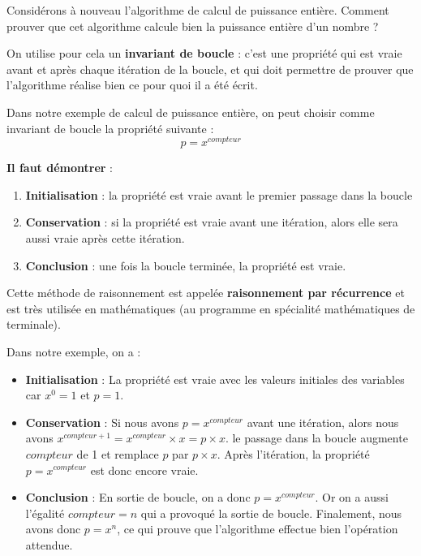 \documentclass[
  a4paper,
  DIV=11,
  numbers=noendperiod]{scrartcl}
\providecommand{\tightlist}{%
  \setlength{\itemsep}{0pt}\setlength{\parskip}{0pt}}\usepackage{longtable,booktabs,array}
\begin{document}
Considérons à nouveau l'algorithme de calcul de puissance entière.
Comment prouver que cet algorithme calcule bien la puissance entière
d'un nombre ?

On utilise pour cela un \textbf{invariant de boucle} : c'est une
propriété qui est vraie avant et après chaque itération de la boucle, et
qui doit permettre de prouver que l'algorithme réalise bien ce pour quoi
il a été écrit.

Dans notre exemple de calcul de puissance entière, on peut choisir comme
invariant de boucle la propriété suivante : \[p=x^{compteur}\]

\begin{tcolorbox}[enhanced jigsaw, rightrule=.15mm, opacitybacktitle=0.6, bottomrule=.15mm, toprule=.15mm, breakable, colback=white, colframe=quarto-callout-important-color-frame, left=2mm, leftrule=.75mm, bottomtitle=1mm, titlerule=0mm, coltitle=black, toptitle=1mm, title=\textcolor{quarto-callout-important-color}{\faExclamation}\hspace{0.5em}{Pour prouver q'une propriété est un invariant de boucle\ldots{}}, arc=.35mm, opacityback=0, colbacktitle=quarto-callout-important-color!10!white]

\textbf{Il faut démontrer} :

\begin{enumerate}
\def\labelenumi{\arabic{enumi}.}
\tightlist
\item
  \textbf{Initialisation} : la propriété est vraie avant le premier
  passage dans la boucle
\item
  \textbf{Conservation} : si la propriété est vraie avant une itération,
  alors elle sera aussi vraie après cette itération.
\item
  \textbf{Conclusion} : une fois la boucle terminée, la propriété est
  vraie.
\end{enumerate}

\end{tcolorbox}

Cette méthode de raisonnement est appelée \textbf{raisonnement par
récurrence} et est très utilisée en mathématiques (au programme en
spécialité mathématiques de terminale).

Dans notre exemple, on a :

\begin{itemize}
\tightlist
\item
  \textbf{Initialisation} : La propriété est vraie avec les valeurs
  initiales des variables car \(x^0=1\) et \(p=1\).
\item
  \textbf{Conservation} : Si nous avons \(p=x^{compteur}\) avant une
  itération, alors nous avons
  \(x^{compteur+1}=x^{compteur}\times x = p\times x\). le passage dans
  la boucle augmente \(compteur\) de 1 et remplace \(p\) par
  \(p\times x\). Après l'itération, la propriété \(p=x^{compteur}\) est
  donc encore vraie.
\item
  \textbf{Conclusion} : En sortie de boucle, on a donc
  \(p=x^{compteur}\). Or on a aussi l'égalité \(compteur = n\) qui a
  provoqué la sortie de boucle. Finalement, nous avons donc \(p=x^n\),
  ce qui prouve que l'algorithme effectue bien l'opération attendue.
\end{itemize}
\end{document}
